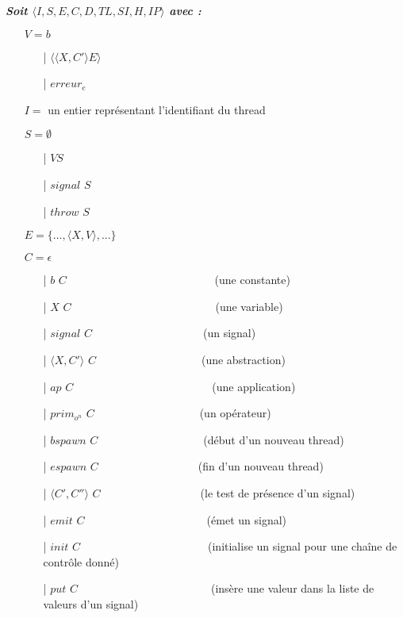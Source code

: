 \documentclass[10pt,a4paper]{article}
\begin{document}
		
					
				\textbf{\textit{Soit $\langle I,S,E,C,D,TL,SI,H,IP\rangle$ avec :}}
					
				\begin{itemize}
					\item[] $V = b$	
					\begin{itemize}
						\item[|] $\langle\langle X,C' \rangle E\rangle$
						\item[|] $erreur_{e}$
					\end{itemize}
					\item[] $I =$ un entier représentant l'identifiant du thread
					\item[] $S =  \emptyset$ 
					\begin{itemize}
						\item[|] $V S$
						\item[|] $signal$ $S$
						\item[|] $throw$ $S$
					\end{itemize}
					\item[] $E = \{...,\langle X,V\rangle,...\}$
					\item[] $C = \epsilon$
					\begin{itemize}
						\item[|] $b$ $C$~~~~~~~~~~~~~~~~~~~~~~~~~~    (une constante)
						\item[|] $X$ $C$~~~~~~~~~~~~~~~~~~~~~~~~~~(une variable)
						\item[|] $signal$ $C$~~~~~~~~~~~~~~~~~~~~(un signal)
						\item[|] $\langle X,C'\rangle$ $C$~~~~~~~~~~~~~~~~~~~(une abstraction)
						\item[|] $ap$ $C$~~~~~~~~~~~~~~~~~~~~~~~~~(une application)
						\item[|] $prim_{o^{n}}$ $C$~~~~~~~~~~~~~~~~~~~(un opérateur)
						\item[|] $bspawn$ $C$~~~~~~~~~~~~~~~~~~~(début d'un nouveau thread)
						\item[|] $espawn$ $C$~~~~~~~~~~~~~~~~~~(fin d'un nouveau thread)
						\item[|] $\langle C',C''\rangle$ $C$~~~~~~~~~~~~~~~~~~(le test de présence d'un signal)
						\item[|] $emit$ $C$~~~~~~~~~~~~~~~~~~~~~~(émet un signal)
						\item[|] $init$ $C$~~~~~~~~~~~~~~~~~~~~~~~(initialise un signal pour une chaîne de contrôle donné)
						\item[|] $put$ $C$~~~~~~~~~~~~~~~~~~~~~~~~(insère une valeur dans la liste de valeurs d'un signal)

\end{itemize}
\end{itemize}
\end{document}

